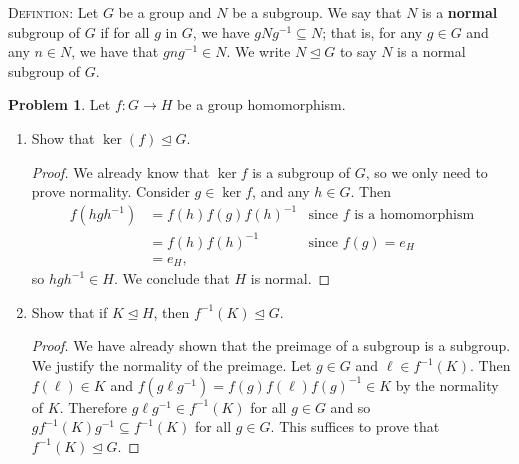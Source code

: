 \documentclass[11pt]{article}
\newcommand{\norm}{\trianglelefteq}
\theoremstyle{definition}
\newtheorem{problem}{Problem}
\begin{document}
\smallskip


\noindent \textsc{Defintion:} Let $G$ be a group and $N$ be a subgroup. We say that $N$ is a \textbf{normal} subgroup of $G$ if for all $g$ in $G$, we have $gNg^{-1} \subseteq N$; that is, for any $g\in G$ and any $n\in N$, we have that $gng^{-1}\in N$. We write $N \trianglelefteq G$ to say $N$ is a normal subgroup of $G$.

\begin{problem} Let $f: G\to H$ be a group homomorphism.
\begin{enumerate}[(4.1)]
\item Show that $\ker(f) \trianglelefteq G$.


\begin{proof}
	We already know that $\ker f$ is a subgroup of $G$, so we only need to prove normality. Consider $g \in \ker f$, and any $h \in G$. Then
	$$\begin{aligned}
	f(hgh^{-1}) & = f(h)f(g)f(h)^{-1} & \textrm{since } f \textrm{ is a homomorphism} \\
	& = f(h)f(h)^{-1} & \textrm{since } f(g) = e_H \\
	& = e_H,
	\end{aligned}$$
	so $hgh^{-1} \in H$. We conclude that $H$ is normal.
\end{proof}

\item Show that if $K \trianglelefteq H$, then $f^{-1}(K) \trianglelefteq G$.


\begin{proof}
We have already shown that the preimage of a subgroup is a subgroup. We justify the normality of the preimage.
Let $g\in G$ and $\ell\in f^{-1}(K)$. Then $f(\ell)\in K$ and $f(g\ell g^{-1})=f(g)f(\ell)f(g)^{-1}\in K$ by the normality of $K$. Therefore $g\ell g^{-1}\in  f^{-1}(K)$ for all $g\in G$ and so  $gf^{-1}(K)g^{-1}\subseteq  f^{-1}(K)$ for all $g\in G$. This suffices to prove that  $f^{-1}(K)\norm G$.
\end{proof}

\end{enumerate}
\end{problem}

\smallskip
\end{document}
